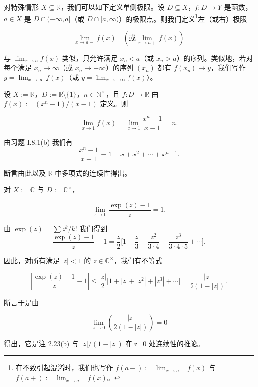 对特殊情形 $ X \subseteq \mathbb{R} $，我们可以如下定义单侧极限。设 $ D \subseteq X $，$ f: D \to Y $ 是函数，$ a \in X $ 是 $ D \cap (-\infty, a] $（或 $ D \cap [a, \infty) $）的极限点。则我们定义\footnote{在不致引起混淆时，我们也写作 $ f(a-) := \lim_{x \to a-} f(x) $ 与 $ f(a+) := \lim_{x \to a+} f(x) $。}左（或右）极限

\[
\lim_{x\to a-}f(x)\quad(\text{或}\lim_{x\to a+}f(x))
\]

与 $\lim_{x \to a} f(x)$ 类似，只允许满足 $x_n < a$（或 $x_n > a$）的序列。类似地，若对每个满足 $x_n \to \infty$（或 $x_n \to -\infty$）的序列 $(x_n)$ 都有 $f(x_n) \to y$，我们写作 $y = \lim_{x \to \infty} f(x)$（或 $y = \lim_{x \to -\infty} f(x)$）。

\begin{example}

\begin{items}
\item

设 $ X := \mathbb{R} $，$ D := \mathbb{R} \setminus \{1\} $，$ n \in \mathbb{N}^\times $，且 $ f: D \to \mathbb{R} $ 由 $ f(x) := (x^n - 1)/(x - 1) $ 定义。则

\[
\lim_{x\to1}f(x)=\lim_{x\to1}\frac{x^{n}-1}{x-1}=n.
\]

\proofhead
由习题 I.8.1(b) 我们有
\[
\frac{x^{n}-1}{x-1}=1+x+x^{2}+\cdots+x^{n-1}.
\]

断言由此以及 $ \mathbb{R} $ 中多项式的连续性得出。

\item

对 $X := \mathbb{C}$ 与 $D := \mathbb{C}^\times$，

\[
\lim_{z\to0}\frac{\exp(z)-1}{z}=1.
\]

\proofhead
由 $ \exp(z) = \sum z^k / k! $ 我们得到
\[
\frac{\exp(z)-1}{z}-1=\frac{z}{2}\Big[1+\frac{z}{3}+\frac{z^{2}}{3\cdot4}+\frac{z^{3}}{3\cdot4\cdot5}+\cdots\Big].
\]

因此，对所有满足 $ |z| < 1 $ 的 $ z \in \mathbb{C}^\times $，我们有不等式

\[
\left|\frac{\exp(z)-1}{z}-1\right|\leq\frac{|z|}{2}\bigl[1+|z|+|z^{2}|+|z^{3}|+\cdots\bigr]=\frac{|z|}{2(1-|z|)}.
\]

断言于是由

\[
\lim_{z\to0}\left(\frac{|z|}{2(1-|z|)}\right)=0
\]

得出，它是注 2.23(b) 与 $ |z|/(1-|z|) $ 在 z=0 处连续性的推论。

\item


\end{items}
\end{example}
